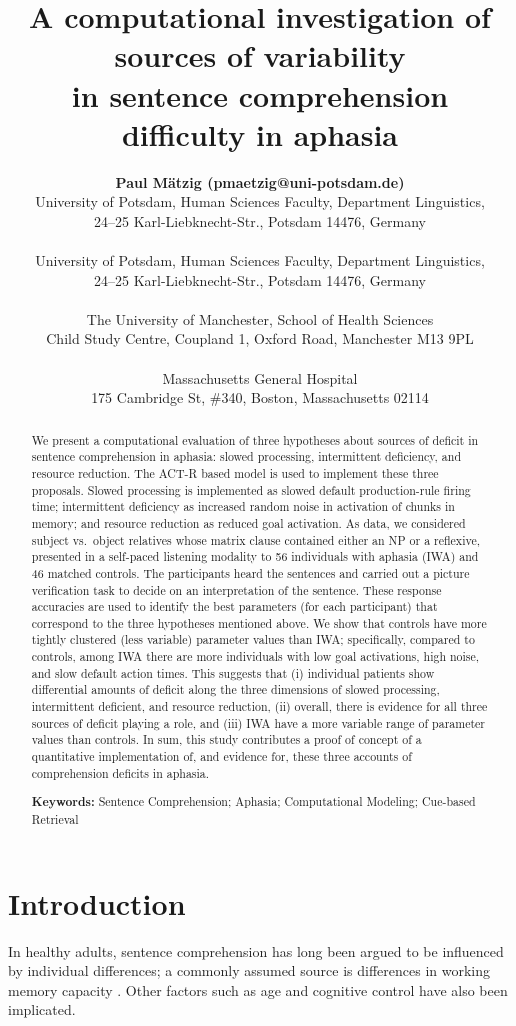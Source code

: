 \documentclass[10pt,letterpaper]{article}
\title{A computational investigation of sources of variability\\
 in sentence comprehension difficulty in aphasia}
\author{{\large\bf Paul M\"{a}tzig (pmaetzig@uni-potsdam.de)} \\
        University of Potsdam, Human Sciences Faculty, Department Linguistics,\\
        24--25 Karl-Liebknecht-Str., Potsdam 14476, Germany\\
        \AND {\large\bf Shravan Vasishth, (vasishth@uni-potsdam.de)} \\
        University of Potsdam, Human Sciences Faculty, Department Linguistics,\\
        24--25 Karl-Liebknecht-Str., Potsdam 14476, Germany\\
        \AND {\large\bf Felix Engelmann (felix.engelmann@manchester.ac.uk)} \\
        The University of Manchester, School of Health Sciences\\
        Child Study Centre, Coupland 1, Oxford Road, Manchester M13 9PL\\
        \AND {\large\bf David Caplan (dcaplan@partners.org)} \\
        Massachusetts General Hospital \\
        175 Cambridge St, \#340, Boston, Massachusetts 02114}
\begin{document}
\maketitle

\begin{abstract} We present a computational evaluation of three hypotheses about sources of deficit in sentence comprehension in aphasia: slowed processing, intermittent deficiency, and resource reduction.  The ACT-R based  model is used to implement these three proposals. Slowed processing is implemented as slowed default production-rule firing time; intermittent deficiency as increased random noise in activation of chunks in memory; and resource reduction as reduced goal activation. As data, we considered subject vs.\ object relatives whose matrix clause contained either an NP or a reflexive, presented in a self-paced listening modality to 56 individuals with aphasia (IWA) and 46 matched controls. The participants heard the sentences and carried out a picture verification task to decide on an interpretation of the sentence. These response accuracies are used to identify the best parameters (for each participant) that correspond to the three hypotheses mentioned above. We show that controls have more tightly clustered (less variable) parameter values than IWA; specifically, compared to controls, among IWA there are more individuals with low goal activations, high noise, and slow default action times. This suggests that (i) individual patients show differential amounts of deficit along the three dimensions of slowed processing, intermittent deficient, and resource reduction, (ii) overall, there is evidence for all three sources of deficit playing a role, and (iii) IWA have a more variable range of parameter values than controls. In sum, this study contributes a proof of concept of a quantitative implementation of, and evidence for, these three accounts of comprehension deficits in aphasia.

\textbf{Keywords:}  
Sentence Comprehension; Aphasia; Computational Modeling; Cue-based Retrieval
\end{abstract}

\section{Introduction}

In healthy adults, 
sentence comprehension has long been argued to be influenced by individual differences; a commonly assumed source is differences in working memory capacity  \cite{dc80,jc92}. 
Other factors such as age \cite{CaplanWaters2005} and cognitive control \cite{novick2005cognitive} have also been implicated.
\end{document}
